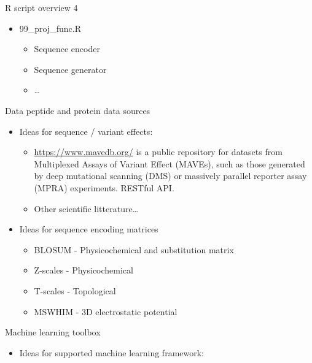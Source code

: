 \documentclass[ignorenonframetext,]{beamer}
\providecommand{\tightlist}{%
  \setlength{\itemsep}{0pt}\setlength{\parskip}{0pt}}
\begin{document}
\begin{frame}
\begin{block}{R script overview 4}
\begin{itemize}
\tightlist
\item
  99\_proj\_func.R

  \begin{itemize}
  \tightlist
  \item
    Sequence encoder
  \item
    Sequence generator
  \item
    \ldots{}
  \end{itemize}
\end{itemize}

\end{block}

\begin{block}{Data peptide and protein data sources}

\begin{itemize}
\tightlist
\item
  Ideas for sequence / variant effects:

  \begin{itemize}
  \tightlist
  \item
    \url{https://www.mavedb.org/} is a public repository for datasets
    from Multiplexed Assays of Variant Effect (MAVEs), such as those
    generated by deep mutational scanning (DMS) or massively parallel
    reporter assay (MPRA) experiments. RESTful API.
  \item
    Other scientific litterature\ldots{}
  \end{itemize}
\item
  Ideas for sequence encoding matrices

  \begin{itemize}
  \tightlist
  \item
    BLOSUM - Physicochemical and substitution matrix
  \item
    Z-scales - Physicochemical
  \item
    T-scales - Topological
  \item
    MSWHIM - 3D electrostatic potential
  \end{itemize}
\end{itemize}

\end{block}

\begin{block}{Machine learning toolbox}

\begin{itemize}
\item
  Ideas for supported machine learning framework:


\end{itemize}
\end{block}
\end{frame}
\end{document}
